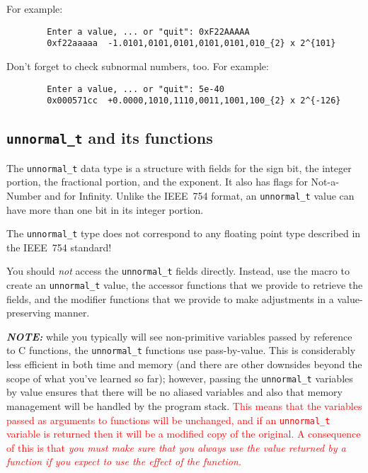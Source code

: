 \begin{description}
\end{description}
For example:

\begin{verbatim}
        Enter a value, ... or "quit": 0xF22AAAAA
        0xf22aaaaa	-1.0101,0101,0101,0101,0101,010_{2} x 2^{101}
\end{verbatim}

Don't forget to check subnormal numbers, too.
For example:

\begin{verbatim}
        Enter a value, ... or "quit": 5e-40
        0x000571cc	+0.0000,1010,1110,0011,1001,100_{2} x 2^{-126}
\end{verbatim}

\subsection{\texttt{unnormal\_t} and its functions} \label{subsec:unnormal}

The \lstinline{unnormal_t} data type is a structure with fields for the sign bit, the integer portion, the fractional portion, and the exponent.
It also has flags for Not-a-Number and for Infinity.
Unlike the IEEE~754 format, an \lstinline{unnormal_t} value can have more than one bit in its integer portion.

\hspace{-2cm}\colorbox{red!25}{The \lstinline{unnormal_t} type does not correspond to any floating point type described in the IEEE~754 standard!}

You should \textit{not} access the \lstinline{unnormal_t} fields directly.
Instead, use the  macro to create an \lstinline{unnormal_t} value, the accessor functions that we provide to retrieve the fields, and the modifier functions that we provide to make adjustments in a value-preserving manner.

\textit{\textbf{NOTE:}} while you typically will see non-primitive variables passed by reference to C functions, the \lstinline{unnormal_t} functions use pass-by-value.
This is considerably less efficient in both time and memory (and there are other downsides beyond the scope of what you've learned so far);
however, passing the \lstinline{unnormal_t} variables by value ensures that there will be no aliased variables and also that memory management will be handled by the program stack.
\textcolor{red}{This means that the variables passed as arguments to functions will be unchanged, and if an \lstinline{unnormal_t} variable is returned then it will be a modified copy of the original.
A consequence of this is that \textit{you must make sure that you always use the value returned by a function if you expect to use the effect of the function.}}

